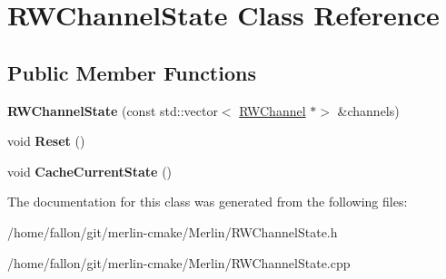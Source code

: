 \hypertarget{classRWChannelState}{}\section{R\+W\+Channel\+State Class Reference}
\label{classRWChannelState}
\subsection*{Public Member Functions}
\begin{DoxyCompactItemize}
\item 
\mbox{\label{classRWChannelState_a915f0173f6ad3d24e1df25bd50fd2808}} 
{\bfseries R\+W\+Channel\+State} (const std\+::vector$<$ \hyperlink{classRWChannel}{R\+W\+Channel} $\ast$$>$ \&channels)
\item 
\mbox{\label{classRWChannelState_a35501c441cbc4904ba1dc710331a1ce2}} 
void {\bfseries Reset} ()
\item 
\mbox{\label{classRWChannelState_a0e98bb9d7f5ef09cd7455d917bbd3462}} 
void {\bfseries Cache\+Current\+State} ()
\end{DoxyCompactItemize}


The documentation for this class was generated from the following files\+:\begin{DoxyCompactItemize}
\item 
/home/fallon/git/merlin-\/cmake/\+Merlin/R\+W\+Channel\+State.\+h\item 
/home/fallon/git/merlin-\/cmake/\+Merlin/R\+W\+Channel\+State.\+cpp\end{DoxyCompactItemize}
